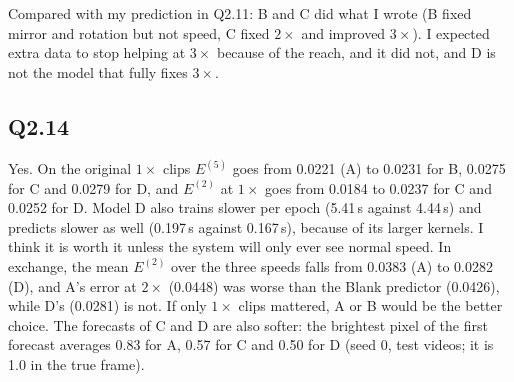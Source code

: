 \documentclass[11pt,letterpaper]{article}
\begin{document}
Compared with my prediction in Q2.11: B and C did what I wrote (B fixed mirror and rotation but not speed, C
fixed $2\times$ and improved $3\times$). I expected extra data to stop helping at $3\times$ because of the reach,
and it did not, and D is not the model that fully fixes $3\times$.

\subsection*{Q2.14}

Yes. On the original $1\times$ clips $E^{(5)}$ goes from 0.0221 (A) to 0.0231 for B, 0.0275 for C and 0.0279 for D, and $E^{(2)}$ at $1\times$ goes from 0.0184 to 0.0237 for C and 0.0252 for D.
Model D also trains slower per epoch (5.41\,s against 4.44\,s) and predicts slower as well (0.197\,s against
0.167\,s), because of its larger kernels. I think it is worth it unless the system will only ever see normal speed.
In exchange, the mean $E^{(2)}$ over the three speeds falls from 0.0383 (A) to 0.0282 (D), and A's error at
$2\times$ (0.0448) was worse than the Blank predictor (0.0426), while D's (0.0281) is not. If only $1\times$ clips
mattered, A or B would be the better choice. The forecasts of C and D are also softer: the brightest pixel of the
first forecast averages 0.83 for A, 0.57 for C and 0.50 for D (seed 0, test videos; it is 1.0 in the true frame).
\end{document}
